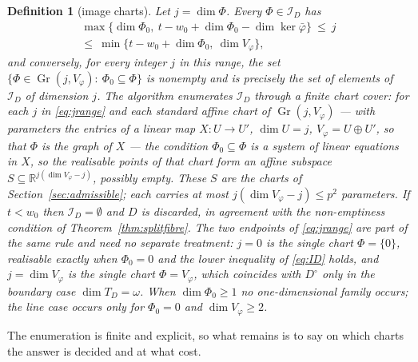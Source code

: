 \documentclass[journal]{IEEEtran}
\theoremstyle{plainn}
\newtheorem{defn}{Definition}
\theoremstyle{remark}
\newcommand{\Gr}{\operatorname{Gr}}
\begin{document}
\begin{defn}[image charts]\label{defn:charts}
Let $j=\dim\Phi$. Every $\Phi\in\mathcal I_D$ has
\begin{equation}\label{eq:jrange}
\begin{gathered}
\max\bigl\{\dim\Phi_0,\ t-w_0+\dim\Phi_0-\dim\ker\bar\varphi\bigr\}\ \le\ j\\
\le\ \min\bigl\{t-w_0+\dim\Phi_0,\ \dim V_\varphi\bigr\},
\end{gathered}
\end{equation}
and conversely, for every integer $j$ in this range, the set
$\{\Phi\in\Gr(j,V_\varphi):\ \Phi_0\subseteq\Phi\}$ is nonempty and is precisely the set of elements of
$\mathcal I_D$ of dimension $j$. The algorithm enumerates $\mathcal I_D$ through a finite chart cover: for
each $j$ in \eqref{eq:jrange} and each standard affine chart of $\Gr(j,V_\varphi)$ --- with parameters the
entries of a linear map $X:U\to U'$, $\dim U=j$, $V_\varphi=U\oplus U'$, so that $\Phi$ is the graph of $X$
--- the condition $\Phi_0\subseteq\Phi$ is a system of linear equations in $X$, so the realisable points of
that chart form an affine subspace $S\subseteq\mathbb R^{j(\dim V_\varphi-j)}$, possibly empty. These $S$
are the charts of Section~\ref{sec:admissible}; each carries at most $j(\dim V_\varphi-j)\le p^2$
parameters. If $t<w_0$ then $\mathcal I_D=\emptyset$ and $D$ is discarded, in agreement with the
non-emptiness condition of Theorem~\ref{thm:splitfibre}. The two endpoints of \eqref{eq:jrange} are part of
the same rule and need no separate treatment: $j=0$ is the single chart $\Phi=\{0\}$, realisable exactly
when $\Phi_0=0$ and the lower inequality of \eqref{eq:ID} holds, and $j=\dim V_\varphi$ is the single chart
$\Phi=V_\varphi$, which coincides with $D^\circ$ only in the boundary case $\dim T_D=\omega$. When
$\dim\Phi_0\ge1$ no one-dimensional family occurs; the line case occurs only for $\Phi_0=0$ and
$\dim V_\varphi\ge2$.
\end{defn}

The enumeration is finite and explicit, so what remains is to say on which charts the answer is decided
and at what cost.
\end{document}
